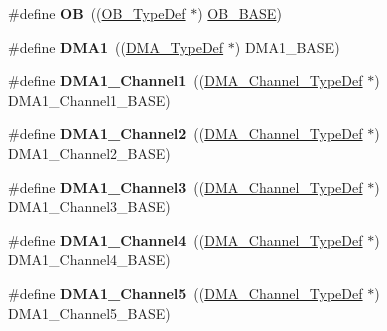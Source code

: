 \begin{DoxyCompactItemize}
\item 
\hypertarget{group___peripheral__declaration_gad2d5f875cdc6d696735f20fa23a895c3}{\#define {\bfseries O\-B}~((\hyperlink{struct_o_b___type_def}{O\-B\-\_\-\-Type\-Def} $\ast$) \hyperlink{group___peripheral__memory__map_gab5b5fb155f9ee15dfb6d757da1adc926}{O\-B\-\_\-\-B\-A\-S\-E})}\label{group___peripheral__declaration_gad2d5f875cdc6d696735f20fa23a895c3}

\item 
\hypertarget{group___peripheral__declaration_gacc16d2a5937f7585320a98f7f6b578f9}{\#define {\bfseries D\-M\-A1}~((\hyperlink{struct_d_m_a___type_def}{D\-M\-A\-\_\-\-Type\-Def} $\ast$) D\-M\-A1\-\_\-\-B\-A\-S\-E)}\label{group___peripheral__declaration_gacc16d2a5937f7585320a98f7f6b578f9}

\item 
\hypertarget{group___peripheral__declaration_gac83c5be824be1c02716e2522e80ddf7a}{\#define {\bfseries D\-M\-A1\-\_\-\-Channel1}~((\hyperlink{struct_d_m_a___channel___type_def}{D\-M\-A\-\_\-\-Channel\-\_\-\-Type\-Def} $\ast$) D\-M\-A1\-\_\-\-Channel1\-\_\-\-B\-A\-S\-E)}\label{group___peripheral__declaration_gac83c5be824be1c02716e2522e80ddf7a}

\item 
\hypertarget{group___peripheral__declaration_ga23d7631dd10c645e06971b2543ba2949}{\#define {\bfseries D\-M\-A1\-\_\-\-Channel2}~((\hyperlink{struct_d_m_a___channel___type_def}{D\-M\-A\-\_\-\-Channel\-\_\-\-Type\-Def} $\ast$) D\-M\-A1\-\_\-\-Channel2\-\_\-\-B\-A\-S\-E)}\label{group___peripheral__declaration_ga23d7631dd10c645e06971b2543ba2949}

\item 
\hypertarget{group___peripheral__declaration_gacf7b6093a37b306d7f1f50b2f200f0d0}{\#define {\bfseries D\-M\-A1\-\_\-\-Channel3}~((\hyperlink{struct_d_m_a___channel___type_def}{D\-M\-A\-\_\-\-Channel\-\_\-\-Type\-Def} $\ast$) D\-M\-A1\-\_\-\-Channel3\-\_\-\-B\-A\-S\-E)}\label{group___peripheral__declaration_gacf7b6093a37b306d7f1f50b2f200f0d0}

\item 
\hypertarget{group___peripheral__declaration_gad2c42743316bf64da557130061b1f56a}{\#define {\bfseries D\-M\-A1\-\_\-\-Channel4}~((\hyperlink{struct_d_m_a___channel___type_def}{D\-M\-A\-\_\-\-Channel\-\_\-\-Type\-Def} $\ast$) D\-M\-A1\-\_\-\-Channel4\-\_\-\-B\-A\-S\-E)}\label{group___peripheral__declaration_gad2c42743316bf64da557130061b1f56a}

\item 
\hypertarget{group___peripheral__declaration_ga06ff98ddef3c962795d2e2444004abff}{\#define {\bfseries D\-M\-A1\-\_\-\-Channel5}~((\hyperlink{struct_d_m_a___channel___type_def}{D\-M\-A\-\_\-\-Channel\-\_\-\-Type\-Def} $\ast$) D\-M\-A1\-\_\-\-Channel5\-\_\-\-B\-A\-S\-E)}\label{group___peripheral__declaration_ga06ff98ddef3c962795d2e2444004abff}


\end{DoxyCompactItemize}
